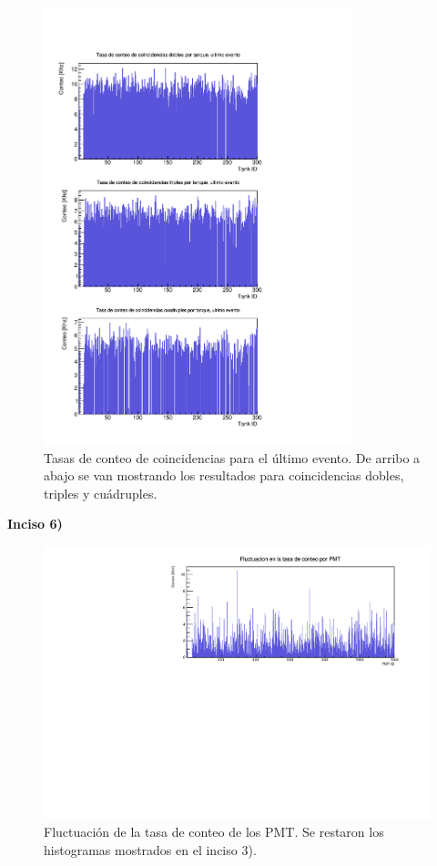 \documentclass[11pt]{article}
\begin{document}
\begin{figure}[H]
\centering
\includegraphics[width=0.8\textwidth]{../Figuras/Prob5UltimoEvento.pdf}
\caption{Tasas de conteo de coincidencias para el último evento. De arribo a abajo se van mostrando los resultados para coincidencias dobles, triples y cuádruples.}
\label{fig:Prob5-1}
\end{figure}


\textbf{Inciso 6)}


\begin{figure}[H]
\centering
\includegraphics[width=1\textwidth]{../Figuras/Fluctuaciones.pdf}
\caption{Fluctuación de la tasa de conteo de los PMT. Se restaron los histogramas mostrados en el inciso 3).}
\label{fig:Prob6}
\end{figure}
\end{document}
